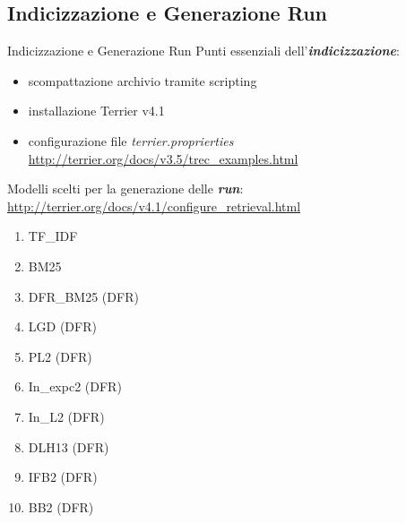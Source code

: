 \subsection{Indicizzazione e Generazione Run}
\begin{frame}{Indicizzazione e Generazione Run}
	Punti essenziali dell'\textbf{\textit{indicizzazione}}:
	\begin{itemize}
		\item scompattazione archivio tramite scripting
		\item installazione Terrier v4.1
		\item configurazione file \textit{terrier.proprierties} \\ \url{http://terrier.org/docs/v3.5/trec_examples.html}
	\end{itemize}

	\vspace{1em}

	Modelli scelti per la generazione delle \textbf{\textit{run}}: \\
	{\footnotesize{\url{http://terrier.org/docs/v4.1/configure_retrieval.html}}}
	\begin{multicols}{2}
		\begin{enumerate}
			\item TF\_IDF
			\item BM25
			\item DFR\_BM25 (DFR)
			\item LGD (DFR)
			\item PL2 (DFR)
			\item In\_expc2 (DFR)
			\item In\_L2 (DFR)
			\item DLH13 (DFR)
			\item IFB2 (DFR)
			\item BB2 (DFR)
		\end{enumerate}
	\end{multicols}
\end{frame}



